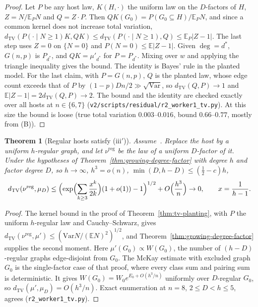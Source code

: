 \documentclass[11pt]{article}
\newtheorem{theorem}{Theorem}
\newcommand{\EE}{\mathbb{E}}
\newcommand{\Var}{\mathrm{Var}}
\newcommand{\dTV}{d_{\mathrm{TV}}}
\begin{document}
\begin{proof}
Let \(P\) be any host law, \(K(H,\cdot)\) the uniform law on the \(D\)-factors of
\(H\), \(Z=N/\EE_PN\) and \(Q=Z\cdot P\). Then \(QK(G_0)=P(G_0\subseteq H)/\EE_PN\),
and since a common kernel does not increase total variation,
\(\dTV(P(\cdot\mid N\ge1)K,QK)\le\dTV(P(\cdot\mid N\ge1),Q)\le\EE_P\lvert Z-1\rvert\).
The last step uses \(Z=0\) on \(\{N=0\}\) and \(P(N=0)\le\EE\lvert Z-1\rvert\).
Given \(\deg=d^*\), \(G(n,p)\) is \(P_{d^*}\), and \(QK=\mu'_{d^*}\) for
\(P=P_{d^*}\). Mixing over \(w\) and applying the triangle inequality gives the
bound. The identity is Bayes' rule in the planted model. For the last claim, with
\(P=G(n,p)\), \(Q\) is the planted law, whose edge count exceeds that of \(P\) by
\((1-p)Dn/2\gg\sqrt{\Var}\), so \(\dTV(Q,P)\to1\) and
\(\EE\lvert Z-1\rvert=2\dTV(Q,P)\to2\). The bound and the identity are checked
exactly over all hosts at \(n\in\{6,7\}\)
(\texttt{v2/scripts/residual/r2\_worker1\_tv.py}). At this size the bound is loose
(true total variation \(0.003\)--\(0.016\), bound \(0.66\)--\(0.77\), mostly from (B)).
\end{proof}

\begin{theorem}[Regular hosts satisfy (iii\('\))]
\label{thm:tv-regular-host}
Assume~\cite[Theorem~4.6]{McK85}. Replace the host by a uniform \(h\)-regular graph,
and let \(\nu^{\mathrm{reg}}\) be the law of a uniform \(D\)-factor of it. Under
the hypotheses of Theorem~\ref{thm:growing-degree-factor} with degree \(h\) and
factor degree \(D\), so \(h\to\infty\), \(h^3=o(n)\), \(\min(D,h-D)\le(\tfrac12-c)h\),
\[
\dTV(\nu^{\mathrm{reg}},\mu_D)\le\Bigl(\exp\Bigl(\sum_{k\ge3}\frac{x^k}{2k}\Bigr)(1+o(1))-1\Bigr)^{1/2}
+O\Bigl(\frac{h^3}n\Bigr)\to0,\qquad x=\frac1{h-1}.
\]
\end{theorem}

\begin{proof}
The kernel bound in the proof of Theorem~\ref{thm:tv-planting}, with \(P\) the
uniform \(h\)-regular law and Cauchy--Schwarz, gives
\(\dTV(\nu^{\mathrm{reg}},\mu')\le(\Var N/(\EE N)^2)^{1/2}\), and
Theorem~\ref{thm:growing-degree-factor} supplies the second moment. Here
\(\mu'(G_0)\propto W(G_0)\), the number of \((h-D)\)-regular graphs edge-disjoint from
\(G_0\). The McKay estimate with excluded graph \(G_0\) is the single-factor case of
that proof, where every class sum and pairing sum is deterministic. It gives
\(W(G_0)=W_0e^{E_0+O(h^3/n)}\) uniformly over \(D\)-regular \(G_0\), so
\(\dTV(\mu',\mu_D)=O(h^3/n)\). Exact enumeration at \(n=8\), \(2\le D<h\le5\),
agrees (\texttt{r2\_worker1\_tv.py}).
\end{proof}
\end{document}
